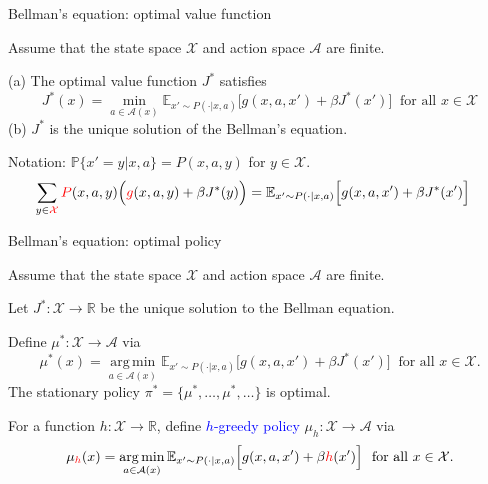 \documentclass{beamer}
\newcommand{\Prob}{\mathbb{P}}
\def\R{{\mathbb R}}
\def\X{{\mathcal X}}
\def\E{{\mathbb E}}
\def\A{{\mathcal A}}
\newcommand{\blue}[1]{\textcolor{blue}{#1}}
\newcommand{\red}[1]{\textcolor{red}{#1}}
\DeclareMathOperator*{\argmin}{arg\,min}
\begin{document}
\begin{frame}{Bellman's equation: optimal value function}



  \begin{theorem}
    Assume that the state space $\X$ and action space $\A$ are finite.
   
    (a) The optimal value function $J^*$ satisfies
\begin{equation*}
J^*(x) = \min\limits_{a\in \mathcal{A}(x)}\E_{x'\sim P(\cdot|x, a)}\Big[ g(x, a, x') + \beta J^* (x') \Big]  ~\text{  for all $x\in \X$} %
\end{equation*}
(b) $J^*$ is the unique solution of the Bellman's equation.

\end{theorem}

\indent Notation: \quad $\Prob\{x'=y| x, a\}=P(x,a,y)$ for $y\in \mathcal{X}$.
\begin{align*}
 \sum_{y\in \mathcal{\red{X}}} \red{P}(x,a,y)
  \Big(\red{g}(x,a, y)+ \beta J^*(y) \Big) &=  \E_{x'\sim P(\cdot|x, a)}\Big[ g(x, a, x') + \beta J^* (x') \Big]
\end{align*}

\end{frame}



\begin{frame}{Bellman's equation: optimal policy}

  \begin{theorem}
    Assume that the state space $\X$ and action space $\A$ are finite. 
    
    Let $J^*: \mathcal{X}\to \R$ be the unique solution to the Bellman equation.

    Define $\mu^*: \mathcal{X}\to \mathcal{A}$ via
\begin{equation*}
\mu^*(x) = \argmin\limits_{a\in \mathcal{A}(x)}\E_{x'\sim P(\cdot|x, a)}\Big[ g(x, a, x') + \beta J^* (x') \Big]  ~\text{  for all $x\in \X$}. %
\end{equation*}
The stationary policy $\pi^*=\{\mu^*, \ldots, \mu^*, \ldots\}$ is optimal.
\end{theorem}

\noindent For a function $h:\mathcal{X}\to \R$, define \blue{$h$-greedy policy} $\mu_h: \mathcal{X}\to \mathcal{A}$ via
\begin{align*}
\mu_{\red{h}}(x) = \argmin\limits_{a\in \mathcal{A}(x)}\E_{x'\sim P(\cdot|x, a)}\Big[ g(x, a, x') + \beta \red{h}(x') \Big]  ~\text{  for all $x\in \X$}. %
\end{align*}



\end{frame}
\end{document}
